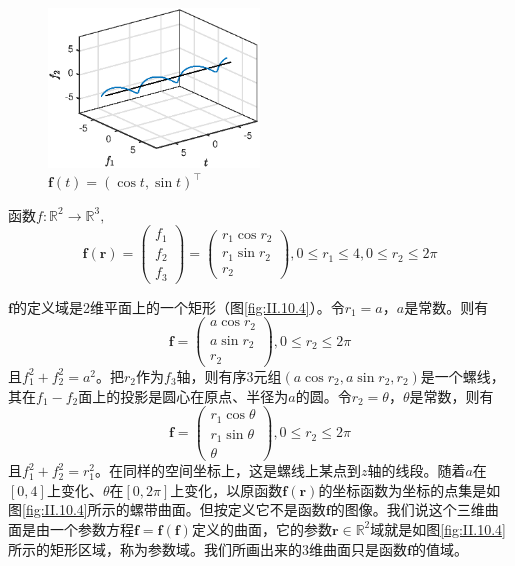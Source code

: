 \documentclass[main.tex]{subfiles}
\begin{document}
\begin{figure}[h]
    \centering
    \includegraphics[width=0.5\textwidth]{images/II.10.3.eps}
    \caption{$\mathbf{f}\left(t\right)=\left(\cos t,\sin t\right)^\intercal$}
    \label{fig:II.10.3}
\end{figure}
\begin{example}
    函数$f:\mathbb{R}^2\rightarrow\mathbb{R}^3,$
    \[
        \mathbf{f}\left(\mathbf{r}\right)=\left(\begin{array}{c}f_1\\f_2\\f_3\end{array}\right)=\left(\begin{array}{c}r_1\cos r_2\\r_1\sin r_2\\r_2\end{array}\right),0\leq r_1\leq 4,0\leq r_2\leq 2\pi
    \]

    $\mathbf{f}$的定义域是2维平面上的一个矩形（图\ref{fig:II.10.4}）。令$r_1=a$，$a$是常数。则有
    \[
        \mathbf{f}=\left(\begin{array}{c}
                a\cos r_2 \\
                a\sin r_2 \\
                r_2
            \end{array}\right),0\leq r_2\leq 2\pi
    \]
    且$f_1^2+f_2^2=a^2$。把$r_2$作为$f_3$轴，则有序3元组$\left(a\cos r_2,a\sin r_2,r_2\right)$是一个螺线，其在$f_1-f_2$面上的投影是圆心在原点、半径为$a$的圆。令$r_2=\theta$，$\theta$是常数，则有
    \[
        \mathbf{f}=\left(\begin{array}{c}
                r_1\cos \theta \\
                r_1\sin \theta \\
                \theta
            \end{array}\right),0\leq r_2\leq 2\pi
    \]
    且$f_1^2+f_2^2=r_1^2$。在同样的空间坐标上，这是螺线上某点到$z$轴的线段。随着$a$在$\left[0,4\right]$上变化、$\theta$在$\left[0,2\pi\right]$上变化，以原函数$\mathbf{f}\left(\mathbf{r}\right)$的坐标函数为坐标的点集是如图\ref{fig:II.10.4}所示的螺带曲面。但按定义它不是函数$\mathbf{f}$的图像。我们说这个三维曲面是由一个参数方程$\mathbf{f}=\mathbf{f}\left(\mathbf{f}\right)$定义的曲面，它的参数$\mathbf{r}\in\mathbb{R}^2$域就是如图\ref{fig:II.10.4}所示的矩形区域，称为参数域。我们所画出来的3维曲面只是函数$\mathbf{f}$的值域。
\end{example}
\end{document}
